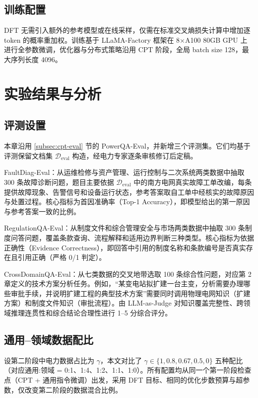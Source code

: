 \documentclass[fontset=fandol,type=master,campus=shenzhen,etitleauto=true]{hithesisbook}
\begin{document}
\subsection{训练配置}\label{subsec:sft-config}

DFT 无需引入额外的参考模型或在线采样，仅需在标准交叉熵损失计算中增加逐 token 的概率重加权。训练基于 LLaMA-Factory 框架在 8×A100 80GB GPU 上进行全参数微调，优化器与分布式策略沿用 CPT 阶段，全局 batch size 128，最大序列长度 4096。

\section{实验结果与分析}\label{sft-ux8badux7ec3ux4e0eux5b9eux9a8cux7ed3ux679c}

\subsection{评测设置}\label{subsec:sft-eval}

本章沿用 \ref{subsec:cpt-eval} 节的 PowerQA-Eval，并新增三个评测集。它们均基于评测保留文档集 $\mathcal{D}_{\text{eval}}$ 构造，经电力专家逐条审核修订后定稿。

FaultDiag-Eval：从运维检修与资产管理、运行控制与二次系统两类数据中抽取 300 条故障诊断问题，题目主要依据 $\mathcal{D}_{\text{eval}}$ 中的南方电网真实故障工单改编，每条提供故障现象、告警信号和设备运行状态，参考答案取自工单中经核实的故障原因与处置过程。核心指标为首因准确率（Top-1 Accuracy），即模型给出的第一原因与参考答案一致的比例。

RegulationQA-Eval：从制度文件和综合管理安全与市场两类数据中抽取 300 条制度问答问题，覆盖条款查询、流程解释和适用边界判断三种类型。核心指标为依据正确性（Evidence Correctness），即回答中引用的制度名称和条款编号是否真实存在且引用正确（严格 0/1 判定）。

CrossDomainQA-Eval：从七类数据的交叉地带选取 100 条综合性问题，对应第 2 章定义的技术方案分析任务。例如，“某变电站拟扩建一台主变，分析需要办理哪些审批手续，并说明扩建工程的典型技术方案”需要同时调用物理电网知识（扩建方案）和制度文件知识（审批流程）。由 LLM-as-Judge 对知识覆盖完整性、跨领域推理连贯性和综合结论合理性进行 1--5 分综合评分。
\subsection{通用--领域数据配比}\label{subsec:sft-ratio}

设第二阶段中电力数据占比为 $\gamma$，本文对比了 $\gamma \in \{1, 0.8, 0.67, 0.5, 0\}$ 五种配比（对应通用:领域 = 0:1、1:4、1:2、1:1、1:0）。所有配置均从同一个第一阶段检查点（CPT + 通用指令微调）出发，采用 DFT 目标、相同的优化步数预算与超参数，仅改变第二阶段的数据混合比例。
\end{document}
